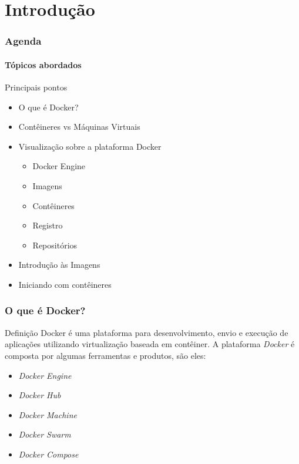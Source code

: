 \documentclass[12pt]{beamer}
\begin{document}
\section{Introdução}
\begin{frame}
  \frametitle{Agenda}
  \framesubtitle{Tópicos abordados}
  \begin{block}{Principais pontos}
    \begin{itemize}
      \item O que é Docker?
      \item Contêineres vs Máquinas Virtuais
      \item Visualização sobre a plataforma Docker
        \begin{itemize}
          \item Docker Engine
          \item Imagens
          \item Contêineres
          \item Registro
          \item Repositórios
        \end{itemize}
      \item Introdução às Imagens
      \item Iniciando com contêineres
        \end{itemize}
  \end{block}
\end{frame}
\begin{frame}
  \frametitle{O que é Docker?}
  \begin{block}{Definição}
          Docker é uma plataforma para desenvolvimento, envio e execução de
          aplicações utilizando virtualização baseada em contêiner.
          A plataforma \emph{Docker} é composta por algumas ferramentas e
          produtos, são eles:
  \begin{itemize}
    \item \emph{Docker Engine}
    \item \emph{Docker Hub}
    \item \emph{Docker Machine}
    \item \emph{Docker Swarm}
    \item \emph{Docker Compose}
  \end{itemize}
  \end{block}
\end{frame}
\end{document}
